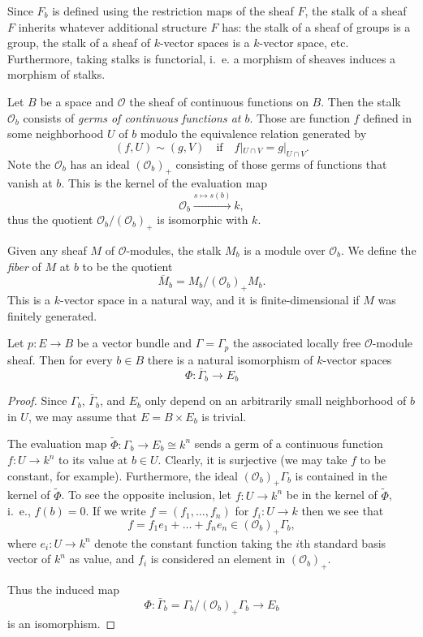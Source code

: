 \documentclass[a4paper,openany]{scrbook}
\begin{document}
Since $F_b$ is defined using the restriction maps of the sheaf $F$, the stalk of a sheaf $F$ inherits whatever additional structure $F$ has: the stalk of a sheaf of groups is a group, the stalk of a sheaf of $k$-vector spaces is a $k$-vector space, etc. Furthermore, taking stalks is functorial, i.~e. a morphism of sheaves induces a morphism of stalks.

\begin{example}
Let $B$ be a space and $\mathcal O$ the sheaf of continuous functions on $B$. Then the stalk $\mathcal O_b$ consists of \emph{germs of continuous functions at $b$}. Those are function $f$ defined in some neighborhood $U$ of $b$ modulo the equivalence relation generated by
\[
(f,U) \sim (g,V) \quad \text{if} \quad  f|_{U\cap V} = g|_{U\cap V}.
\]
Note the $\mathcal O_b$ has an ideal $(\mathcal O_b)_+$ consisting of those germs of functions that vanish at $b$. This is the kernel of the evaluation map
\[
\mathcal O_b \xrightarrow{s \mapsto s(b)} k,
\]
thus the quotient $\mathcal O_b/(\mathcal O_b)_+$ is isomorphic with $k$.
\end{example}

Given any sheaf $M$ of $\mathcal O$-modules, the stalk $M_b$ is a module over $\mathcal O_b$. We define the \emph{fiber} of $M$ at $b$ to be the quotient
\[
\overline M_b = M_b / (\mathcal O_b)_+M_b.
\]
This is a $k$-vector space in a natural way, and it is finite-dimensional if $M$ was finitely generated.

\begin{lemma}\label{lemma:fiberreconstruction}
Let $p\colon E \to B$ be a vector bundle and $\Gamma=\Gamma_p$ the associated locally free $\mathcal O$-module sheaf. Then for every $b \in B$ there is a natural isomorphism of $k$-vector spaces
\[
\Phi\colon \overline\Gamma_b \to E_b
\]
\end{lemma}
\begin{proof}
Since $\Gamma_b$, $\bar\Gamma_b$, and $E_b$ only depend on an arbitrarily small neighborhood of $b$ in $U$, we may assume that $E = B \times E_b$ is trivial.

The evaluation map $\tilde \Phi\colon \Gamma_b \to E_b \cong k^n$ sends a germ of a continuous function $f\colon U \to k^n$ to its value at $b \in U$. Clearly, it is surjective (we may take $f$ to be constant, for example). Furthermore, the ideal $(\mathcal O_b)_+\Gamma_b$ is contained in the kernel of $\tilde \Phi$. To see the opposite inclusion, let $f\colon U \to k^n$ be in the kernel of $\tilde \Phi$, i.~e., $f(b)=0$. If we write $f=(f_1,\dots,f_n)$ for $f_i \colon U \to k$ then we see that
\[
f = f_1 e_1 + \dots + f_n e_n \in (\mathcal O_b)_+\Gamma_b,
\]
where $e_i\colon U \to k^n$ denote the constant function taking the $i$th standard basis vector of $k^n$ as value, and $f_i$ is considered an element in $(\mathcal O_b)_+$.

Thus the induced map
\[
\Phi\colon \bar \Gamma_b = \Gamma_b/(\mathcal O_b)_+\Gamma_b \to E_b
\]
is an isomorphism.
\end{proof}
\end{document}

